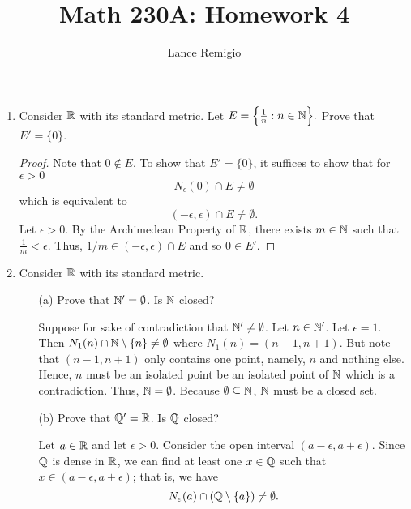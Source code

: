 \documentclass[a4paper]{article}
\title{Math 230A: Homework 4}
\author{Lance Remigio}
\begin{document}
\maketitle    
{}
\rhead{\thepage}

\begin{enumerate}
    \item Consider \( \mathbb{R}  \) with its standard metric. Let \( E = \Big\{ \frac{ 1 }{ n }  : n \in \mathbb{N} \Big\}.    \) Prove that \( E' = \{ 0 \}  \).
        \begin{proof}
        Note that \( 0 \notin E \). To show that \( E' = \{ 0  \}  \), it suffices to show that for \( \epsilon > 0  \)
        \[  {N}_{\epsilon}(0) \cap E \neq \emptyset \]
        which is equivalent to 
        \[  (- \epsilon, \epsilon) \cap E \neq \emptyset. \]
        Let \( \epsilon > 0 \). By the Archimedean Property of \( \mathbb{R}  \), there exists \( m \in \mathbb{N}  \) such that \( \frac{ 1 }{ m }  < \epsilon \). Thus, \( 1/m \in (-\epsilon, \epsilon) \cap E  \) and so \( 0 \in E' \). 
        \end{proof}
    \item Consider \( \mathbb{R}  \) with its standard metric.
        \begin{enumerate}
            \item[(a)] Prove that \( \mathbb{N}' = \emptyset \). Is \( \mathbb{N}  \) closed?
                \begin{solution}
                Suppose for sake of contradiction that \( \mathbb{N}' \neq \emptyset \). Let \( n \in \mathbb{N}' \). Let \( \epsilon = 1  \). Then \( {N}_{1}(n) \cap \mathbb{N} \setminus  \{ n \}  \neq \emptyset \) where \( {N}_{1}(n) = (n-1, n+1) \). But note that \( (n-1, n+1) \) only contains one point, namely, \( n \) and nothing else. Hence, \( n  \) must be an isolated point be an isolated point of \( \mathbb{N}  \) which is a contradiction. Thus, \( \mathbb{N} = \emptyset \). Because \( \emptyset \subseteq  \mathbb{N}  \), \( \mathbb{N}  \) must be a closed set.
                \end{solution}
            \item[(b)] Prove that \( \mathbb{Q}' = \mathbb{R}  \). Is \( \mathbb{Q}  \) closed?
                \begin{solution}
                Let \( a \in \mathbb{R}  \) and let \( \epsilon > 0 \). Consider the open interval \( (a - \epsilon, a + \epsilon) \). Since \( \mathbb{Q}  \) is dense in \( \mathbb{R}  \), we can find at least one \( x \in \mathbb{Q}  \) such that \( x \in (a- \epsilon, a + \epsilon) \); that is, 
                we have 
                \[  {N}_{\varepsilon}(a) \cap (\mathbb{Q} \setminus  \{ a \} ) \neq \emptyset. \]

\end{solution}
\end{enumerate}
\end{enumerate}
\end{document}
